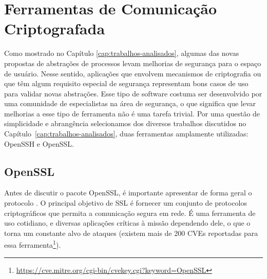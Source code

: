 \section{Ferramentas de Comunicação Criptografada}
\label{sec:com_enc}

Como mostrado no Capítulo \ref{cap:trabalhos-analisados}, algumas das novas
propostas de abstrações de processos levam melhorias de segurança para o espaço
de usuário. Nesse sentido, aplicações que envolvem mecanismos de criptografia
ou que têm algum requisito especial de segurança representam bons casos de uso
para validar novas abstrações. Esse tipo de software costuma ser desenvolvido
por uma comunidade de especialistas na área de segurança, o que significa que
levar melhorias a esse tipo de ferramenta não é uma tarefa trivial. Por uma
questão de simplicidade e abrangência selecionamos dos diversos trabalhos
discutidos no Capítulo~\ref{cap:trabalhos-analisados}, duas ferramentas
amplamente utilizadas: OpenSSH e OpenSSL.

\subsection{OpenSSL}
\label{sec:openssl}

Antes de discutir o pacote OpenSSL, é importante apresentar de forma geral o
protocolo . O principal objetivo de
SSL é fornecer um conjunto de protocolos criptográficos que permita a
comunicação segura em rede. É uma ferramenta de uso cotidiano, e diversas
aplicações críticas à missão dependendo dele, o que o torna um constante alvo
de ataques (existem mais de 200 CVEs reportadas para essa
ferramenta\footnote{\url{https://cve.mitre.org/cgi-bin/cvekey.cgi?keyword=OpenSSL}}).

